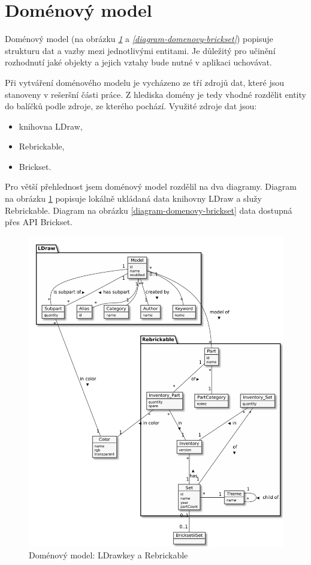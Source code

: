 \section{Doménový model}
Doménový model (na obrázku \emph{\ref{diagram-domenovy}} a \emph{\ref{diagram-domenovy-brickset}}) popisuje strukturu dat a vazby mezi jednotlivými entitami. Je důležitý pro učinění rozhodnutí jaké objekty a jejich vztahy bude nutné v aplikaci uchovávat. 

Při vytváření doménového modelu je vycházeno ze tří zdrojů dat, které jsou stanoveny v rešeršní části práce. Z hlediska domény je tedy vhodné rozdělit entity do balíčků podle zdroje, ze kterého pochází. Využité zdroje dat jsou: 
\begin{itemize}
  \item knihovna LDraw,
  \item Rebrickable,
  \item Brickset.
\end{itemize}

Pro větší přehlednost jsem doménový model rozdělil na dva diagramy. Diagram na obrázku \ref{diagram-domenovy} popisuje lokálně ukládaná data knihovny LDraw a služy Rebrickable. Diagram na obrázku \ref{diagram-domenovy-brickset} data dostupná přes API Brickset. 

\begin{figure}[htbp]
    \centering
    \includegraphics[width=\textwidth,height=\textheight,keepaspectratio]{pdfs/domain_ldraw_rebrickable}
    \caption{Doménový model: LDrawkey a Rebrickable\label{diagram-domenovy}}
  \end{figure}

